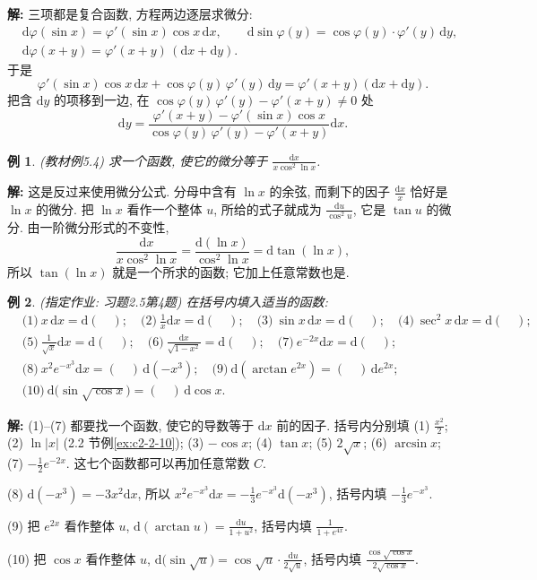 \documentclass[UTF8,openany]{ctexbook}
\theoremstyle{chinesetextbook}
\newtheorem{example}{例}[section]
\newenvironment{cnsolution}{\par\indent\textbf{解:} \ignorespaces}{\par}
\newcommand{\dd}{\mathrm d}
\begin{document}
\begin{cnsolution}
三项都是复合函数, 方程两边逐层求微分:
\[
\begin{aligned}
&\dd\varphi(\sin x)=\varphi'(\sin x)\cos x\,\dd x,\qquad\dd\sin\varphi(y)=\cos\varphi(y)\cdot\varphi'(y)\,\dd y,\\
&\dd\varphi(x+y)=\varphi'(x+y)\,(\dd x+\dd y).
\end{aligned}
\]
于是
\[
\varphi'(\sin x)\cos x\,\dd x+\cos\varphi(y)\,\varphi'(y)\,\dd y=\varphi'(x+y)(\dd x+\dd y).
\]
把含 $\dd y$ 的项移到一边, 在 $\cos\varphi(y)\,\varphi'(y)-\varphi'(x+y)\ne0$ 处
\[
\dd y=\frac{\varphi'(x+y)-\varphi'(\sin x)\cos x}{\cos\varphi(y)\,\varphi'(y)-\varphi'(x+y)}\dd x.
\]
\end{cnsolution}
\begin{example}\label{ex:c2-5-4}
\textnormal{(教材例5.4)} 求一个函数, 使它的微分等于 $\displaystyle\frac{\dd x}{x\cos^2\ln x}$.
\end{example}
\begin{cnsolution}
这是反过来使用微分公式. 分母中含有 $\ln x$ 的余弦, 而剩下的因子 $\displaystyle\frac{\dd x}x$ 恰好是 $\ln x$ 的微分. 把 $\ln x$ 看作一个整体 $u$, 所给的式子就成为 $\displaystyle\frac{\dd u}{\cos^2u}$, 它是 $\tan u$ 的微分. 由一阶微分形式的不变性,
\[
\frac{\dd x}{x\cos^2\ln x}=\frac{\dd(\ln x)}{\cos^2\ln x}=\dd\tan(\ln x),
\]
所以 $\tan(\ln x)$ 就是一个所求的函数; 它加上任意常数也是.
\end{cnsolution}
\begin{example}\label{ex:c2-h5-4}
\textnormal{(指定作业: 习题2.5第4题)} 在括号内填入适当的函数:
\[
\begin{aligned}
&\text{(1)}\ x\,\dd x=\dd(\quad);\quad\text{(2)}\ \frac1x\dd x=\dd(\quad);\quad\text{(3)}\ \sin x\,\dd x=\dd(\quad);\quad\text{(4)}\ \sec^2x\,\dd x=\dd(\quad);\\
&\text{(5)}\ \frac1{\sqrt x}\dd x=\dd(\quad);\quad\text{(6)}\ \frac{\dd x}{\sqrt{1-x^2}}=\dd(\quad);\quad\text{(7)}\ e^{-2x}\dd x=\dd(\quad);\\
&\text{(8)}\ x^2e^{-x^3}\dd x=(\quad)\,\dd(-x^3);\quad\text{(9)}\ \dd(\arctan e^{2x})=(\quad)\,\dd e^{2x};\\
&\text{(10)}\ \dd\bigl(\sin\sqrt{\cos x}\bigr)=(\quad)\,\dd\cos x.
\end{aligned}
\]
\end{example}
\begin{cnsolution}
(1)–(7) 都要找一个函数, 使它的导数等于 $\dd x$ 前的因子. 括号内分别填 (1) $\displaystyle\frac{x^2}2$; (2) $\ln|x|$ (2.2 节例\ref{ex:c2-2-10}); (3) $-\cos x$; (4) $\tan x$; (5) $2\sqrt x$; (6) $\arcsin x$; (7) $\displaystyle-\frac12e^{-2x}$. 这七个函数都可以再加任意常数 $C$.

(8) $\dd(-x^3)=-3x^2\dd x$, 所以 $\displaystyle x^2e^{-x^3}\dd x=-\frac13e^{-x^3}\dd(-x^3)$, 括号内填 $\displaystyle-\frac13e^{-x^3}$.

(9) 把 $e^{2x}$ 看作整体 $u$, $\displaystyle\dd(\arctan u)=\frac{\dd u}{1+u^2}$, 括号内填 $\displaystyle\frac1{1+e^{4x}}$.

(10) 把 $\cos x$ 看作整体 $u$, $\displaystyle\dd\bigl(\sin\sqrt u\bigr)=\cos\sqrt u\cdot\frac{\dd u}{2\sqrt u}$, 括号内填 $\displaystyle\frac{\cos\sqrt{\cos x}}{2\sqrt{\cos x}}$.
\end{cnsolution}
\end{document}
